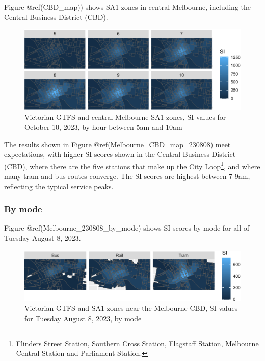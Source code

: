\documentclass[preprint, 3p,
authoryear]{elsarticle} %
\begin{document}
Figure @ref(CBD\_map)) shows SA1 zones in central Melbourne, including
the Central Business District (CBD).

\begin{figure}
\centering
\includegraphics{Leveraging_GTFS_to_assess_transit_supply_Transport_Geography_files/figure-latex/Melbourne_CBD_map_230808-1.pdf}
\caption{Victorian GTFS and central Melbourne SA1 zones, SI values for
October 10, 2023, by hour between 5am and 10am}
\end{figure}

The results shown in Figure @ref(Melbourne\_CBD\_map\_230808) meet
expectations, with higher SI scores shown in the Central Business
District (CBD), where there are the five stations that make up the City
Loop\footnote{Flinders Street Station, Southern Cross Station, Flagstaff
  Station, Melbourne Central Station and Parliament Station.}, and where
many tram and bus routes converge. The SI scores are highest between
7-9am, reflecting the typical service peaks.

\hypertarget{by-mode}{%
\subsubsection{By mode}\label{by-mode}}

Figure @ref(Melbourne\_230808\_by\_mode) shows SI scores by mode for all
of Tuesday August 8, 2023.

\begin{figure}
\centering
\includegraphics{Leveraging_GTFS_to_assess_transit_supply_Transport_Geography_files/figure-latex/Melbourne_230808_by_mode-1.pdf}
\caption{Victorian GTFS and SA1 zones near the Melbourne CBD, SI values
for Tuesday August 8, 2023, by mode}
\end{figure}
\end{document}
